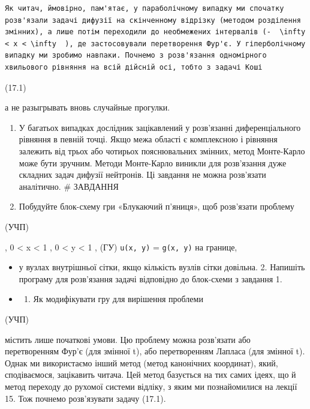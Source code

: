 \documentclass[
  ukrainian,
]{article}
\providecommand{\tightlist}{%
  \setlength{\itemsep}{0pt}\setlength{\parskip}{0pt}}
\begin{document}
\begin{verbatim}
Як читач, ймовірно, пам'ятає, у параболічному випадку ми спочатку розв'язали задачі дифузії на скінченному відрізку (методом розділення змінних), а лише потім переходили до необмежених інтервалів (-  \infty < x < \infty  ), де застосовували перетворення Фур'є. У гіперболічному випадку ми зробимо навпаки. Почнемо з розв'язання одномірного хвильового рівняння на всій дійсній осі, тобто з задачі Коші
\end{verbatim}

(17.1)

а не разыгрывать вновь случайные прогулки.

\begin{enumerate}
\def\labelenumi{\arabic{enumi}.}
\setcounter{enumi}{1}
\tightlist
\item
  У багатьох випадках дослідник зацікавлений у розв'язанні
  диференціального рівняння в певній точці. Якщо межа області є
  комплексною і рівняння залежить від трьох або чотирьох пояснювальних
  змінних, метод Монте-Карло може бути зручним. Методи Монте-Карло
  виникли для розв'язання дуже складних задач дифузії нейтронів. Ці
  завдання не можна розв'язати аналітично. \# ЗАВДАННЯ
\item
  Побудуйте блок-схему гри «Блукаючий п'яниця», щоб розв'язати проблему
\end{enumerate}

(УЧП)

, 0 \textless{} x \textless{} 1 , 0 \textless{} y \textless{} 1 , (ГУ)
\texttt{u(x,\ y)} = \texttt{g(x,\ y)} на границе,

\begin{itemize}
\item
  у вузлах внутрішньої сітки, якщо кількість вузлів сітки довільна. 2.
  Напишіть програму для розв'язання задачі відповідно до блок-схеми з
  завдання 1.
\item
  \begin{enumerate}
  \def\labelenumi{\arabic{enumi}.}
  \setcounter{enumi}{2}
  \tightlist
  \item
    Як модифікувати гру для вирішення проблеми
  \end{enumerate}
\end{itemize}

(УЧП)

містить лише початкові умови. Цю проблему можна розв'язати або
перетворенням Фур'є (для змінної t), або перетворенням Лапласа (для
змінної t). Однак ми використаємо інший метод (метод канонічних
координат), який, сподіваємося, зацікавить читача. Цей метод базується
на тих самих ідеях, що й метод переходу до рухомої системи відліку, з
яким ми познайомилися на лекції 15. Тож почнемо розв'язувати задачу
(17.1).
\end{document}

